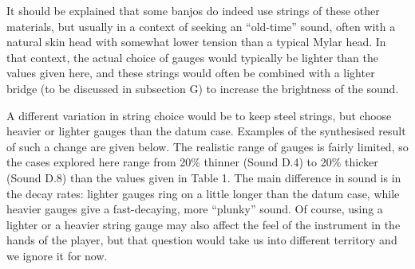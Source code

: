 



  It should be explained that some banjos do indeed use strings of these other 
  materials, but usually in a context of seeking an ``old-time'' sound, often 
  with a natural skin head with somewhat lower tension than a typical Mylar 
  head. In that context, the actual choice of gauges would typically be lighter 
  than the values given here, and these strings would often be combined with a 
  lighter bridge (to be discussed in subsection G) to increase the brightness 
  of the sound. 

  A different variation in string choice would be to keep steel strings, but 
  choose heavier or lighter gauges than the datum case. Examples of the 
  synthesised result of such a change are given below. The realistic range of 
  gauges is fairly limited, so the cases explored here range from 20\% thinner 
  (Sound D.4) to 20\% thicker (Sound D.8) than the values given in Table 1. The 
  main difference in sound is in the decay rates: lighter gauges ring on a 
  little longer than the datum case, while heavier gauges give a fast-decaying, 
  more ``plunky'' sound. Of course, using a lighter or a heavier string gauge 
  may also affect the feel of the instrument in the hands of the player, but 
  that question would take us into different territory and we ignore it for 
  now. 



